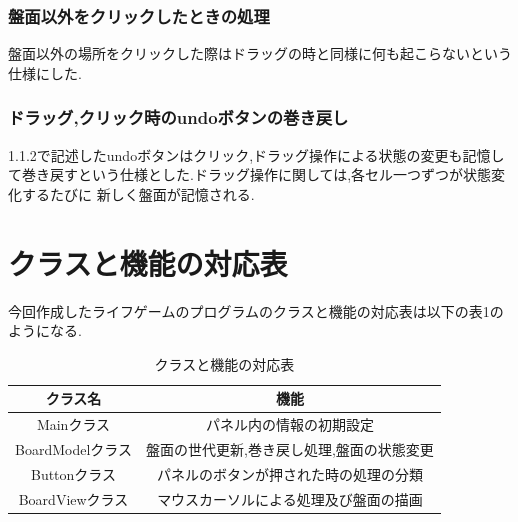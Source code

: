 \documentclass[dvipdfmx]{jarticle}
\begin{document}
\subsubsection{盤面以外をクリックしたときの処理}
盤面以外の場所をクリックした際はドラッグの時と同様に何も起こらないという仕様にした.
\subsubsection{ドラッグ,クリック時のundoボタンの巻き戻し}
1.1.2で記述したundoボタンはクリック,ドラッグ操作による状態の変更も記憶して巻き戻すという仕様とした.ドラッグ操作に関しては,各セル一つずつが状態変化するたびに
新しく盤面が記憶される.

\section{クラスと機能の対応表}
今回作成したライフゲームのプログラムのクラスと機能の対応表は以下の表1のようになる.
\begin{table}[h]
  \centering
  \begin{tabular}{|c|c|}
    \hline
    クラス名&機能\\\hline\hline
    Mainクラス&パネル内の情報の初期設定\\\hline
    BoardModelクラス&盤面の世代更新,巻き戻し処理,盤面の状態変更\\\hline
    Buttonクラス&パネルのボタンが押された時の処理の分類\\\hline
    BoardViewクラス&マウスカーソルによる処理及び盤面の描画\\\hline
  \end{tabular}
  \caption{クラスと機能の対応表}
\end{table}
\end{document}
